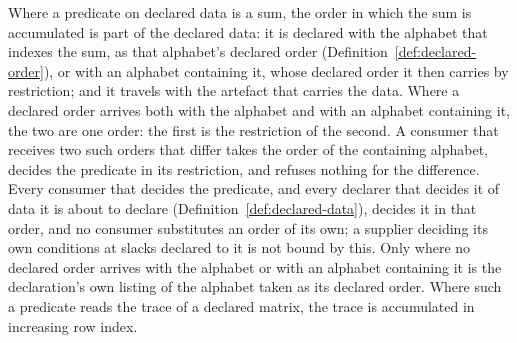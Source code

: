 
\begin{requirement}\label{req:declared-order}
Where a predicate on declared data is a sum, the order in which the sum is
accumulated is part of the declared data: it is declared with the alphabet
that indexes the sum, as that alphabet's declared order
(Definition~\ref{def:declared-order}), or with an alphabet containing it,
whose declared order it then carries by restriction; and it travels with the
artefact that carries the data. Where a declared order arrives both with the
alphabet and with an alphabet containing it, the two are one order: the first
is the restriction of the second. A consumer that receives two such orders
that differ takes the order of the containing alphabet, decides the predicate
in its restriction, and refuses nothing for the difference. Every consumer that decides the predicate,
and every declarer that decides it of data it is about to declare
(Definition~\ref{def:declared-data}), decides it in that order, and no
consumer substitutes an order of its own; a supplier deciding its own
conditions at slacks declared to it is not bound by this. Only where no
declared order arrives with the alphabet or with an alphabet containing it is
the declaration's own listing of the alphabet taken as its declared order.
Where such a predicate reads the trace of a declared matrix, the trace is
accumulated in increasing row index.
\end{requirement}

